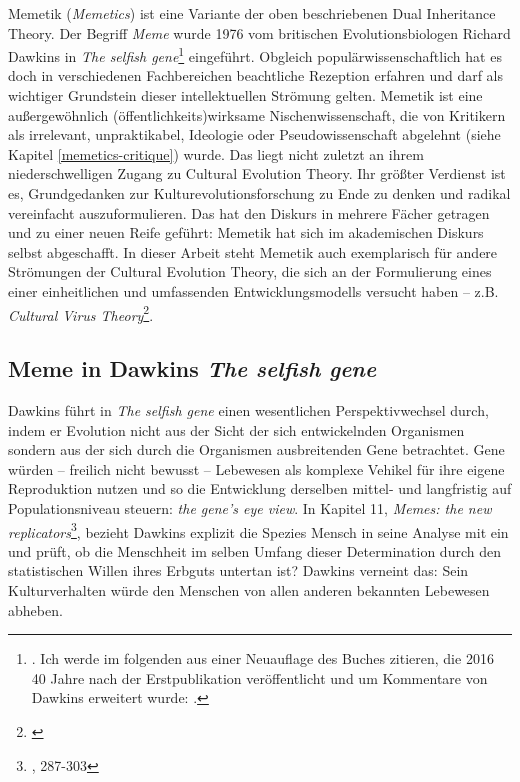 \documentclass[openany,twoside,twocolumn]{book}
\let\rmarkdownfootnote\footnote%
\def\footnote{\protect\rmarkdownfootnote}
\begin{document}
Memetik (\emph{Memetics}) ist eine Variante der oben beschriebenen Dual
Inheritance Theory. Der Begriff \emph{Meme} wurde 1976 vom britischen
Evolutionsbiologen Richard Dawkins in \emph{The selfish gene}\footnote{\textcite{Dawkinsselfishgene1976}.
  Ich werde im folgenden aus einer Neuauflage des Buches zitieren, die
  2016 40 Jahre nach der Erstpublikation veröffentlicht und um
  Kommentare von Dawkins erweitert wurde:
  \textcite{Dawkinsselfishgene40th2016}.} eingeführt. Obgleich
populärwissenschaftlich hat es doch in verschiedenen Fachbereichen
beachtliche Rezeption erfahren und darf als wichtiger Grundstein dieser
intellektuellen Strömung gelten. Memetik ist eine außergewöhnlich
(öffentlichkeits)wirksame Nischenwissenschaft, die von Kritikern als
irrelevant, unpraktikabel, Ideologie oder Pseudowissenschaft abgelehnt
(siehe Kapitel \ref{memetics-critique}) wurde. Das liegt nicht zuletzt
an ihrem niederschwelligen Zugang zu Cultural Evolution Theory. Ihr
größter Verdienst ist es, Grundgedanken zur Kulturevolutionsforschung zu
Ende zu denken und radikal vereinfacht auszuformulieren. Das hat den
Diskurs in mehrere Fächer getragen und zu einer neuen Reife geführt:
Memetik hat sich im akademischen Diskurs selbst abgeschafft. In dieser
Arbeit steht Memetik auch exemplarisch für andere Strömungen der
Cultural Evolution Theory, die sich an der Formulierung eines einer
einheitlichen und umfassenden Entwicklungsmodells versucht haben -- z.B.
\emph{Cultural Virus Theory}\footnote{\textcite{cullen_contagious_2000}}.

\hypertarget{memetics-dawkins}{%
\subsection{\texorpdfstring{Meme in Dawkins \emph{The selfish
gene}}{Meme in Dawkins The selfish gene}}\label{memetics-dawkins}}

Dawkins führt in \emph{The selfish gene} einen wesentlichen
Perspektivwechsel durch, indem er Evolution nicht aus der Sicht der sich
entwickelnden Organismen sondern aus der sich durch die Organismen
ausbreitenden Gene betrachtet. Gene würden -- freilich nicht bewusst --
Lebewesen als komplexe Vehikel für ihre eigene Reproduktion nutzen und
so die Entwicklung derselben mittel- und langfristig auf
Populationsniveau steuern: \emph{the gene's eye view}. In Kapitel 11,
\emph{Memes: the new replicators}\footnote{\textcite{Dawkinsselfishgene40th2016},
  287-303}, bezieht Dawkins explizit die Spezies Mensch in seine Analyse
mit ein und prüft, ob die Menschheit im selben Umfang dieser
Determination durch den statistischen Willen ihres Erbguts untertan ist?
Dawkins verneint das: Sein Kulturverhalten würde den Menschen von allen
anderen bekannten Lebewesen abheben.
\end{document}
